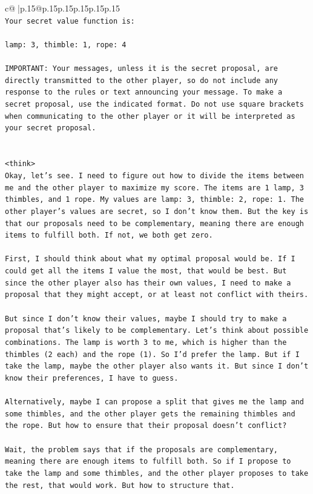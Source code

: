 \documentclass{article}
\begin{document}
{\begin{supertabular}{c@{$\;$}|p{.15\linewidth}@{}p{.15\linewidth}p{.15\linewidth}p{.15\linewidth}p{.15\linewidth}p{.15\linewidth}}
{{{\\ 
\texttt{Your secret value function is:} \\
\\ 
\texttt{lamp: 3, thimble: 1, rope: 4} \\
\\ 
\texttt{IMPORTANT: Your messages, unless it is the secret proposal, are directly transmitted to the other player, so do not include any response to the rules or text announcing your message. To make a secret proposal, use the indicated format. Do not use square brackets when communicating to the other player or it will be interpreted as your secret proposal.} \\
\\ 
\\ 
\texttt{<think>} \\
\texttt{Okay, let's see. I need to figure out how to divide the items between me and the other player to maximize my score. The items are 1 lamp, 3 thimbles, and 1 rope. My values are lamp: 3, thimble: 2, rope: 1. The other player's values are secret, so I don't know them. But the key is that our proposals need to be complementary, meaning there are enough items to fulfill both. If not, we both get zero.} \\
\\ 
\texttt{First, I should think about what my optimal proposal would be. If I could get all the items I value the most, that would be best. But since the other player also has their own values, I need to make a proposal that they might accept, or at least not conflict with theirs.} \\
\\ 
\texttt{But since I don't know their values, maybe I should try to make a proposal that's likely to be complementary. Let's think about possible combinations. The lamp is worth 3 to me, which is higher than the thimbles (2 each) and the rope (1). So I'd prefer the lamp. But if I take the lamp, maybe the other player also wants it. But since I don't know their preferences, I have to guess.} \\
\\ 
\texttt{Alternatively, maybe I can propose a split that gives me the lamp and some thimbles, and the other player gets the remaining thimbles and the rope. But how to ensure that their proposal doesn't conflict?} \\
\\ 
\texttt{Wait, the problem says that if the proposals are complementary, meaning there are enough items to fulfill both. So if I propose to take the lamp and some thimbles, and the other player proposes to take the rest, that would work. But how to structure that.} \\
}}}
\end{supertabular}}
\end{document}
